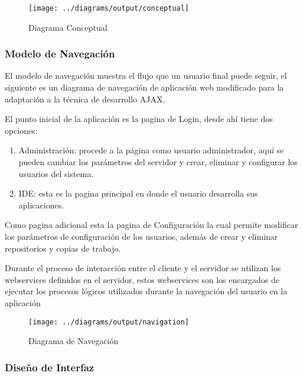 \begin{landscape}
\begin{figure}
 \centering
 \texttt{[image: ../diagrams/output/conceptual]}
 \caption{Diagrama Conceptual}
 \label{diagrama:conceptual}
\end{figure}
\end{landscape}


\subsubsection{Modelo de Navegación}

El modelo de navegación muestra el flujo que un usuario final puede seguir, el siguiente es un diagrama de navegación de aplicación web modificado para la adaptación a la técnica de desarrollo AJAX.

El punto inicial de la aplicación es la pagina de Login, desde ahí tiene dos opciones:

\begin{enumerate}
	
	\item Administración: procede a la página como usuario administrador, aquí se pueden cambiar los parámetros del servidor y crear, eliminar y configurar los usuarios del sistema.
	
	\item IDE: esta es la pagina principal en donde el usuario desarrolla sus aplicaciones.
	
\end{enumerate}

Como pagina adicional esta la pagina de Configuración la cual permite modificar los parámetros de configuración de los usuarios, además de crear y eliminar repositorios y copias de trabajo.

Durante el proceso de interacción entre el cliente y el servidor se utilizan los webservices definidos en el servidor, estos webservices son los encargados de ejecutar los procesos lógicos utilizados durante la navegación del usuario en la aplicación

\begin{landscape}
\begin{figure}
 \centering
 \texttt{[image: ../diagrams/output/navigation]}
 \caption{Diagrama de Navegación}
 \label{diagrama:navegación}
\end{figure}
\end{landscape}


\subsubsection{Diseño de Interfaz}

